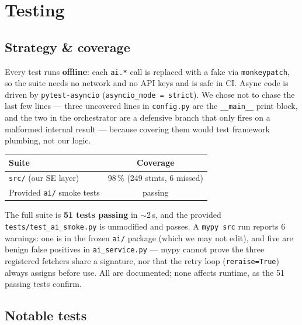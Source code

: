 \documentclass[11pt,a4paper]{article}
\begin{document}
\section{Testing}\label{sec:testing}

\subsection{Strategy \& coverage}

Every test runs \textbf{offline}: each \texttt{ai.*} call is replaced with a fake via
\texttt{monkeypatch}, so the suite needs no network and no API keys and is safe in CI. Async
code is driven by \texttt{pytest-asyncio} (\texttt{asyncio\_mode = strict}). We chose not to
chase the last few lines --- three uncovered lines in \texttt{config.py} are the
\texttt{\_\_main\_\_} print block, and the two in the orchestrator are a defensive branch that
only fires on a malformed internal result --- because covering them would test framework
plumbing, not our logic.

\begin{center}\small
\begin{tabular}{lc}
\toprule
\textbf{Suite} & \textbf{Coverage} \\
\midrule
\texttt{src/} (our SE layer) & 98\,\% (249 stmts, 6 missed) \\
Provided \texttt{ai/} smoke tests & passing \\
\bottomrule
\end{tabular}
\end{center}

The full suite is \textbf{51 tests passing} in $\sim$2\,s, and the provided
\texttt{tests/test\_ai\_smoke.py} is unmodified and passes.
A \texttt{mypy src} run reports 6 warnings: one is in the frozen \texttt{ai/} package (which we
may not edit), and five are benign false positives in \texttt{ai\_service.py} --- mypy cannot
prove the three registered fetchers share a signature, nor that the retry loop
(\texttt{reraise=True}) always assigns before use. All are documented; none affects runtime,
as the 51 passing tests confirm.

\subsection{Notable tests}
\end{document}
